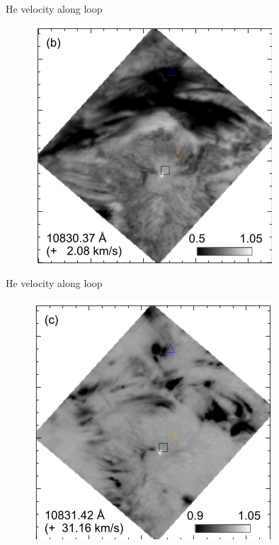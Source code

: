 \documentclass{beamer}
\begin{document}
\begin{frame}{He velocity along loop}
 
\begin{figure}[H]
 \centering
 \includegraphics[scale=0.6]{spb.png}
\end{figure}

\end{frame}

\begin{frame}{He velocity along loop}
 
\begin{figure}[H]
 \centering
 \includegraphics[scale=0.6]{spc.png}
\end{figure}

\end{frame}
\end{document}
